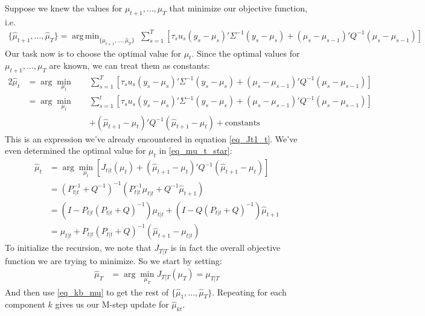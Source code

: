 \documentclass[11pt]{article}
\DeclareMathOperator*{\argmin}{arg\,min}
\begin{document}
Suppose we knew the values for $\mu_{t+1}, \dotsc, \mu_{T}$ that minimize our objective function, i.e.
\begin{align*}
	\{\hat\mu_{t+1}, \dotsc, \hat\mu_T\} = \argmin_{\{\mu_{t+1}, \dotsc, \hat\mu_T\}} \;
	\sum_{s=1}^T \left[ \tau_s u_s (y_s - \mu_s)' \Sigma^{-1} (y_s - \mu_s) 
	+ (\mu_s - \mu_{s-1})' Q^{-1} (\mu_s - \mu_{s-1}) \right]
\end{align*}
Our task now is to choose the optimal value for $\mu_t$. Since the optimal values for $\mu_{t+1}, \dotsc, \mu_T$ are known, we can treat them as constants:
\begin{alignat*}{2}
	\hat \mu_t
	&= \arg \min_{\mu_t} \; &&
	\sum_{s=1}^T \left[ \tau_s u_s (y_s - \mu_s)' \Sigma^{-1} (y_s - \mu_s) 
	+ (\mu_s - \mu_{s-1})' Q^{-1} (\mu_s - \mu_{s-1}) \right]
	\\
	&= \arg \min_{\mu_t} \; &&
	\sum_{s=1}^t \left[ \tau_s u_s (y_s - \mu_s)' \Sigma^{-1} (y_s - \mu_s) 
	+ (\mu_s - \mu_{s-1})' Q^{-1} (\mu_s - \mu_{s-1}) \right]
	\\
	&&& + (\hat\mu_{t+1}-\mu_t)'Q^{-1}(\hat\mu_{t+1} - \mu_t) 
	+ \mathrm{constants}
\end{alignat*}
This is an expression we've already encountered in equation \eqref{eq_Jt1_t}. We've even determined the optimal value for $\mu_t$ in \eqref{eq_mu_t_star}:
\begin{align}
	\hat \mu_t
	&= \arg \min_{\mu_t} \left[ J_{t|t}(\mu_t) + (\hat\mu_{t+1}-\mu_t)'Q^{-1}(\hat\mu_{t+1} - \mu_t)  \right] \nonumber \\
	&= (P_{t|t}^{-1} + Q^{-1})^{-1} ( P_{t|t}^{-1} \mu_{t|t} + Q^{-1} \hat\mu_{t+1} ) \nonumber \\
	&= \left(I - P_{t|t}(P_{t|t} + Q)^{-1}\right) \mu_{t|t} + \left(I - Q(P_{t|t} + Q)^{-1}\right) \hat\mu_{t+1} \nonumber \\
	&= \mu_{t|t} + P_{t|t}(P_{t|t} + Q)^{-1} (\hat\mu_{t+1} - \mu_{t|t} ) \label{eq_kb_mu}
\end{align}
To initialize the recursion, we note that $J_{T|T}$ is in fact the overall objective function we are trying to minimize. So we start by setting:
\begin{align}
	\hat\mu_T &= \arg \min_{\mu_T} J_{T|T}(\mu_T) = \mu_{T|T}
\end{align}
And then use \eqref{eq_kb_mu} to get the rest of $\{\hat\mu_1, \dotsc, \hat\mu_T\}$. Repeating for each component $k$ gives us our M-step update for $\hat\mu_{kt}$.
\end{document}
